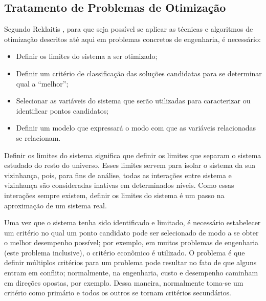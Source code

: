 \subsection{Tratamento de Problemas de Otimiza\c{c}\~{a}o}\label{sub:tratamento}
Segundo Reklaitis \cite{reklaitis}, para que seja poss\'{i}vel se aplicar as t\'{e}cnicas e algoritmos de otimiza\c{c}\~{a}o descritos at\'{e} aqui em problemas concretos de engenharia, \'{e} necess\'{a}rio:
\begin{itemize}
\item Definir os limites do sistema a ser otimizado;
\item Definir um crit\'{e}rio de classifica\c{c}\~{a}o das solu\c{c}\~{o}es candidatas para se determinar qual a ``melhor'';
\item Selecionar as vari\'{a}veis do sistema que ser\~{a}o utilizadas para caracterizar ou identificar pontos candidatos;
\item Definir um modelo que expressar\'{a} o modo com que as vari\'{a}veis relacionadas se relacionam.
\end{itemize}

Definir os limites do sistema significa que definir os limites que separam o sistema estudado do resto do universo. Esses limites servem para isolar o sistema da sua vizinhan\c{c}a, pois, para fins de an\'{a}lise, todas as intera\c{c}\~{o}es entre sistema e vizinhan\c{c}a s\~{a}o consideradas inativas em determinados n\'{i}veis. Como essas intera\c{c}\~{o}es sempre existem, definir os limites do sistema \'{e} um passo na aproxima\c{c}\~{a}o de um sistema real.

Uma vez que o sistema tenha sido identificado e limitado, \'{e} necess\'{a}rio estabelecer um crit\'{e}rio no qual um ponto candidato pode ser selecionado de modo a se obter o melhor desempenho poss\'{i}vel; por exemplo, em muitos problemas de engenharia (este problema inclusive), o crit\'{e}rio econ\^{o}mico \'{e} utilizado. O problema \'{e} que definir m\'{u}ltiplos crit\'{e}rios para um problema pode resultar no fato de que alguns entram em conflito; normalmente, na engenharia, custo e desempenho caminham em dire\c{c}\~{o}es opostas, por exemplo. Dessa maneira, normalmente toma-se um crit\'{e}rio como prim\'{a}rio e todos os outros se tornam crit\'{e}rios secund\'{a}rios.

